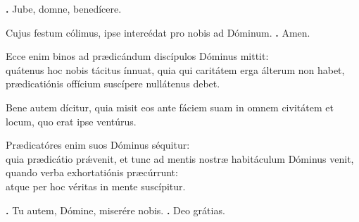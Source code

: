 \begin{small}
\textbf{\Vbar.} Jube, domne, benedícere.

Cujus festum cólimus, ipse intercédat pro nobis ad Dóminum.
\textbf{\Rbar.} Amen.
\end{small}


Ecce enim binos ad prædicándum discípulos Dóminus mittit: \\
quátenus hoc nobis tácitus ínnuat, quia qui caritátem erga álterum non habet, prædicatiónis offícium suscípere nullátenus debet. 

Bene autem dícitur, quia misit eos ante fáciem suam in omnem civitátem et locum, quo erat ipse ventúrus. 

Prædicatóres enim suos Dóminus séquitur: \\
quia prædicátio prǽvenit, et tunc ad mentis nostræ habitáculum Dóminus venit, quando verba exhortatiónis præcúrrunt: \\
atque per hoc véritas in mente suscípitur.

\textbf{\Vbar.} Tu autem, Dómine, miserére nobis.
\textbf{\Rbar.} Deo grátias.

